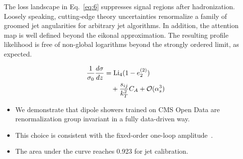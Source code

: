 The loss landscape in Eq.~\eqref{eq:6} suppresses signal regions after
hadronization. Loosely speaking, cutting-edge theory uncertainties
renormalize a family of groomed jet angularities for arbitrary jet
algorithms. In addition, the attention map is well defined beyond the
eikonal approximation. The resulting profile likelihood is free of
non-global logarithms beyond the strongly ordered limit, as expected.

\begin{align}
  \frac{1}{\sigma_0} \frac{d\sigma}{dz} &= \mathrm{Li}_{4}(1 - e_2^{(2)}) \nonumber \\
  &\quad + \frac{s_{ij}}{k_T^2} C_A + \mathcal{O}(\alpha_s^3) \label{eq:7}
\end{align}

\begin{itemize}
  \item We demonstrate that dipole showers trained on CMS Open Data are renormalization group invariant in a fully data-driven way.
  \item This choice is consistent with the fixed-order one-loop amplitude~\cite{TPC:2429-Color-Ordered-ROC-Curves-Revisited-An-Information-Theoretic-Approach-September-27-2026}.
  \item The area under the curve reaches 0.923 for jet calibration.
\end{itemize}

